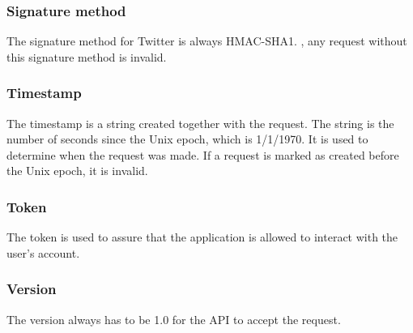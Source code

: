 \subsubsection*{Signature method}
The signature method for Twitter is always HMAC-SHA1. 
, any request
without this signature method is invalid.

\subsubsection*{Timestamp}
The timestamp is a string created together with the request. The string is the
number of seconds since the Unix epoch, which is 1/1/1970. It is used to
determine when the request was made.
If a request is marked as created before the Unix epoch, it is invalid.

\subsubsection*{Token}
The token is used to assure that the application is allowed to
interact with the user's account. 

\subsubsection*{Version}
The version always has to be 1.0 for the API to accept the
request.\cite{TwitterAPIAuth}

